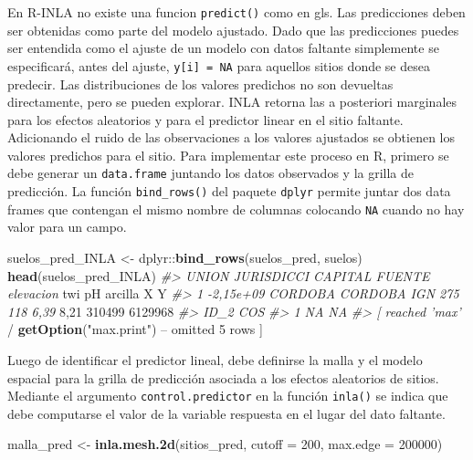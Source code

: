 \documentclass[11pt,b5paper,]{krantz}
\newenvironment{Shaded}{}{}
\newcommand{\CommentTok}[1]{\textcolor[rgb]{0.38,0.63,0.69}{\textit{#1}}}
\newcommand{\DataTypeTok}[1]{\textcolor[rgb]{0.56,0.13,0.00}{#1}}
\newcommand{\DecValTok}[1]{\textcolor[rgb]{0.25,0.63,0.44}{#1}}
\newcommand{\KeywordTok}[1]{\textcolor[rgb]{0.00,0.44,0.13}{\textbf{#1}}}
\newcommand{\NormalTok}[1]{#1}
\newcommand{\OperatorTok}[1]{\textcolor[rgb]{0.40,0.40,0.40}{#1}}
\newcommand{\StringTok}[1]{\textcolor[rgb]{0.25,0.44,0.63}{#1}}
\begin{document}
En R-INLA no existe una funcion \texttt{predict()} como en gls. Las predicciones deben ser obtenidas como parte del modelo ajustado. Dado que las predicciones puedes ser entendida como el ajuste de un modelo con datos faltante simplemente se especificará, antes del ajuste, \texttt{y{[}i{]}\ =\ NA} para aquellos sitios donde se desea predecir. Las distribuciones de los valores predichos no son devueltas directamente, pero se pueden explorar. INLA retorna las a posteriori marginales para los efectos aleatorios y para el predictor linear en el sitio faltante. Adicionando el ruido de las observaciones a los valores ajustados se obtienen los valores predichos para el sitio. Para implementar este proceso en R, primero se debe generar un \texttt{data.frame} juntando los datos observados y la grilla de predicción. La función \texttt{bind\_rows()} del paquete \texttt{dplyr} permite juntar dos data frames que contengan el mismo nombre de columnas colocando \texttt{NA} cuando no hay valor para un campo.

\begin{Shaded}
\begin{Highlighting}[]
\NormalTok{suelos_pred_INLA <-}\StringTok{ }\NormalTok{dplyr}\OperatorTok{::}\KeywordTok{bind_rows}\NormalTok{(suelos_pred,}
\NormalTok{                                     suelos)}
\KeywordTok{head}\NormalTok{(suelos_pred_INLA)}
\CommentTok{#> UNION JURISDICCI CAPITAL FUENTE elevacion}
\NormalTok{twi pH arcilla X Y}
\CommentTok{#> 1 -2,15e+09 CORDOBA CORDOBA IGN 275 118 6,39}
\DecValTok{8}\NormalTok{,}\DecValTok{21} \DecValTok{310499} \DecValTok{6129968}
\CommentTok{#> ID_2 COS}
\CommentTok{#> 1 NA NA}
\CommentTok{#> [ reached 'max'}
    \OperatorTok{/}\StringTok{ }\KeywordTok{getOption}\NormalTok{(}\StringTok{"max.print"}\NormalTok{) }\OperatorTok{--}
\NormalTok{omitted }\DecValTok{5}\NormalTok{ rows ]}
\end{Highlighting}
\end{Shaded}

Luego de identificar el predictor lineal, debe definirse la malla y el modelo espacial para la grilla de predicción asociada a los efectos aleatorios de sitios. Mediante el argumento \texttt{control.predictor} en la función \texttt{inla()} se indica que debe computarse el valor de la variable respuesta en el lugar del dato faltante.

\begin{Shaded}
\begin{Highlighting}[]
\NormalTok{malla_pred <-}\StringTok{ }\KeywordTok{inla.mesh.2d}\NormalTok{(sitios_pred, }
                           \DataTypeTok{cutoff =} \DecValTok{200}\NormalTok{,}
                           \DataTypeTok{max.edge =} \DecValTok{200000}\NormalTok{)}
\end{Highlighting}
\end{Shaded}
\end{document}

